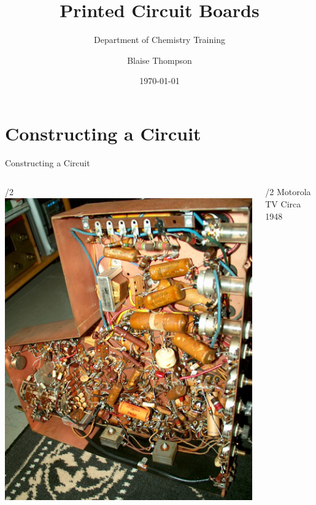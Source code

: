 \documentclass{presentation}
\title{Printed Circuit Boards}
\subtitle{Department of Chemistry Training}
\author{Blaise Thompson}
\institute{University of Wisconsin--Madison}
\date{\today}
\begin{document}
\maketitle

\section{Constructing a Circuit}

\begin{frame}{Constructing a Circuit}
  \begin{columns}
    \begin{column}{\textwidth/2}
      \includegraphics[width=\textwidth]{"./point-to-point.jpeg"}
    \end{column}
    \begin{column}{\textwidth/2}
      Motorola TV Circa 1948
    \end{column}
  \end{columns}
\end{frame}
\end{document}
